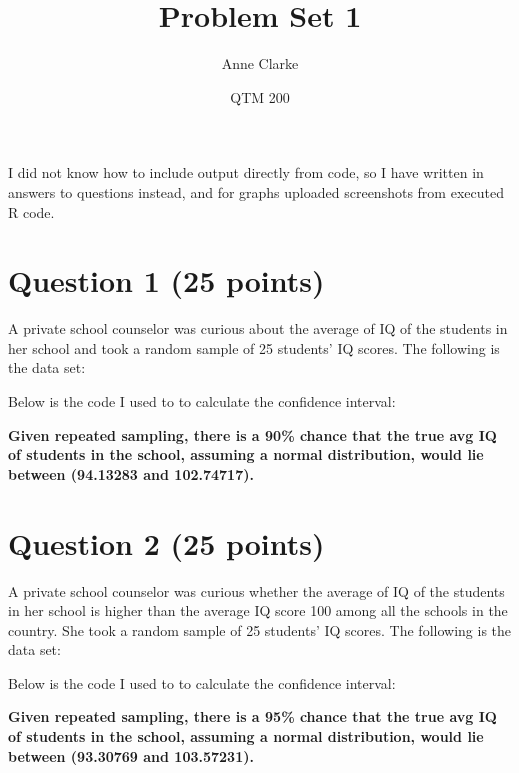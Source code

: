 \documentclass[12pt,letterpaper]{article}
\title{Problem Set 1}
\date{QTM 200}
\author{Anne Clarke}
\begin{document}
	\maketitle
	
	I did not know how to include output directly from code, so I have written in answers to questions instead, and for graphs uploaded screenshots from executed R code. 
	\vspace{1cm}
	\section*{Question 1 (25 points)}
	
	A private school counselor was curious about the average of IQ of the students in her school and took a random sample of 25 students' IQ scores. The following is the data set:
	\vspace{.5cm}
	
	  
	
	\noindent Below is the code I used to to calculate the confidence interval:
	
	  
	
	\noindent \textbf{Given repeated sampling, there is a 90\% chance that the true avg IQ of students in the school, assuming a normal distribution, would lie between (94.13283 and 102.74717).}
	
	\vspace{1cm}
	\section*{Question 2 (25 points)}
	A private school counselor was curious  whether  the average of IQ of the students in her school is higher than the average IQ score 100 among all the schools in the country. She took a random sample of 25 students' IQ scores. The following is the data set:
		\vspace{.5cm}
	
	  
	
	\noindent Below is the code I used to to calculate the confidence interval:
	
	  
	
	\noindent
	\textbf{Given repeated sampling, there is a 95\% chance that the true avg IQ of students in the school, assuming a normal distribution, would lie between (93.30769 and 103.57231).}
	
\end{document}
